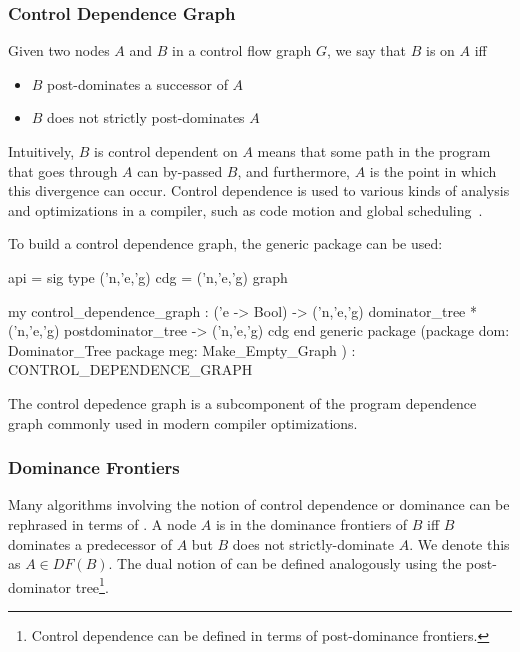 \subsubsection{Control Dependence Graph}
Given two nodes $A$ and $B$ in a control flow graph $G$, 
we say that $B$ is  on $A$ iff
\begin{itemize}
  \item $B$ post-dominates a successor of $A$
  \item $B$ does not strictly post-dominates $A$
\end{itemize}
Intuitively, $B$ is control dependent on $A$ means that
some path in the program that goes through $A$ can by-passed $B$,
and furthermore, $A$ is the point in which this divergence can occur.
Control dependence is used to various kinds of analysis and optimizations in
a compiler, such as code motion and global scheduling~\cite{bernstein-rodeh}.

To build a control dependence graph, the generic package
 can be used:
\begin{SML}
 api  = sig
    type ('n,'e,'g) cdg = ('n,'e,'g) graph

    my control_dependence_graph :
          ('e -> Bool) ->
          ('n,'e,'g) dominator_tree *
          ('n,'e,'g) postdominator_tree ->
          ('n,'e,'g) cdg
 end
 generic package 
    (package dom: Dominator_Tree
     package meg: Make_Empty_Graph
    ) : CONTROL_DEPENDENCE_GRAPH
\end{SML}
The control depedence graph is a subcomponent of the
program dependence graph commonly used in
modern compiler optimizations.

\subsubsection{Dominance Frontiers}

Many algorithms involving the notion of control dependence or dominance
can be rephrased in terms of .
A node $A$ is in the dominance frontiers of $B$ iff
$B$ dominates a predecessor of $A$ but $B$ does not strictly-dominate $A$.
We denote this as $A \in DF(B)$. 
The dual notion of  can be defined
analogously using the post-dominator tree\footnote{Control dependence
can be defined in terms of post-dominance frontiers.}.  

